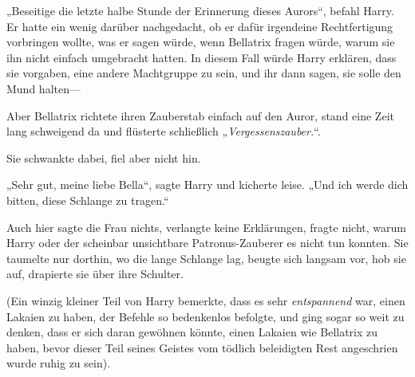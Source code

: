 „Beseitige die letzte halbe Stunde der Erinnerung dieses Aurors“, befahl Harry. Er hatte ein wenig darüber nachgedacht, ob er dafür irgendeine Rechtfertigung vorbringen wollte, was er sagen würde, wenn Bellatrix fragen würde, warum sie ihn nicht einfach umgebracht hatten. In diesem Fall würde Harry erklären, dass sie vorgaben, eine andere Machtgruppe zu sein, und ihr dann sagen, sie solle den Mund halten—

Aber Bellatrix richtete ihren Zauberstab einfach auf den Auror, stand eine Zeit lang schweigend da und flüsterte schließlich „\emph{Vergessenszauber.}“.

Sie schwankte dabei, fiel aber nicht hin.

„Sehr gut, meine liebe Bella“, sagte Harry und kicherte leise. „Und ich werde dich bitten, diese Schlange zu tragen.“

Auch hier sagte die Frau nichts, verlangte keine Erklärungen, fragte nicht, warum Harry oder der scheinbar unsichtbare Patronus-Zauberer es nicht tun konnten. Sie taumelte nur dorthin, wo die lange Schlange lag, beugte sich langsam vor, hob sie auf, drapierte sie über ihre Schulter.

(Ein winzig kleiner Teil von Harry bemerkte, dass es sehr \emph{entspannend} war, einen Lakaien zu haben, der Befehle so bedenkenlos befolgte, und ging sogar so weit zu denken, dass er sich daran gewöhnen könnte, einen Lakaien wie Bellatrix zu haben, bevor dieser Teil seines Geistes vom tödlich beleidigten Rest angeschrien wurde ruhig zu sein).

